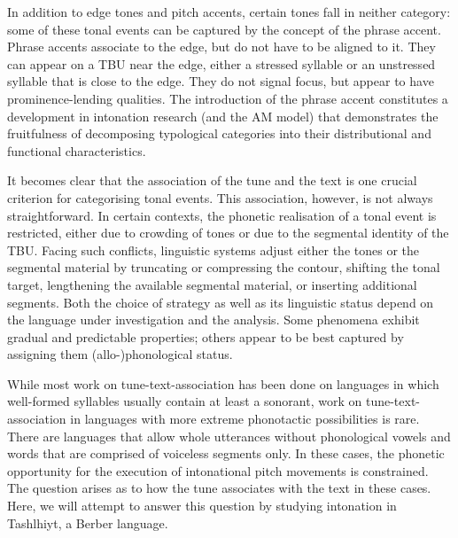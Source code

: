 In addition to edge tones and pitch accents, certain tones fall in neither category: some of these tonal events can be captured by the concept of the phrase accent. Phrase accents associate to the edge, but do not have to be aligned to it. They can appear on a TBU near the edge, either a stressed syllable or an unstressed syllable that is close to the edge. They do not signal focus, but appear to have prominence-lending qualities. The introduction of the phrase accent constitutes a development in intonation research (and the AM model) that demonstrates the fruitfulness of decomposing typological categories into their distributional and functional characteristics. 

It becomes clear that the association of the tune and the text is one crucial criterion for categorising tonal events. This association, however, is not always straightforward. In certain contexts, the phonetic realisation of a tonal event is restricted, either due to crowding of tones or due to the segmental identity of the TBU. Facing such conflicts, linguistic systems adjust either the tones or the segmental material by truncating or compressing the contour, shifting the tonal target, lengthening the available segmental material, or inserting additional segments. Both the choice of strategy as well as its linguistic status depend on the language under investigation and the analysis. Some phenomena exhibit gradual and predictable properties; others appear to be best captured by assigning them (allo-)phonological status.

While most work on tune-text-association has been done on languages in which well-formed syllables usually contain at least a sonorant, work on tune-text-association in languages with more extreme phonotactic possibilities is rare. There are languages that allow whole utterances without phonological vowels and words that are comprised of voiceless segments only. In these cases, the phonetic opportunity for the execution of intonational pitch movements is constrained. The question arises as to how the tune associates with the text in these cases. Here, we will attempt to answer this question by studying intonation in Tashlhiyt, a Berber language.

